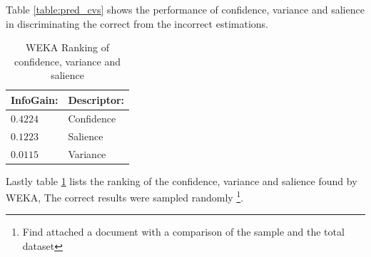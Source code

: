 \documentclass{article}
\begin{document}
Table \ref{table:pred_cvs} shows the performance of confidence, variance and salience in discriminating the correct from the incorrect estimations.
\begin{table}[h]
    \begin{center}
        \begin{tabular}{ | l | l |}
            \hline
            InfoGain:   &   Descriptor: \\  \hline
            \hline
            $0.4224$    &   Confidence  \\  \hline
            $0.1223$    &   Salience    \\  \hline
            $0.0115$    &   Variance    \\  \hline
        \end{tabular}
        \caption{WEKA Ranking of confidence, variance and salience}
        \label{table:weka_cvs}
    \end{center}
\end{table}
Lastly table \ref{table:weka_cvs} lists the ranking of the confidence, variance and salience found by WEKA, The correct results were sampled randomly \footnote{Find attached a document with a comparison of the sample and the total dataset}.
\end{document}

